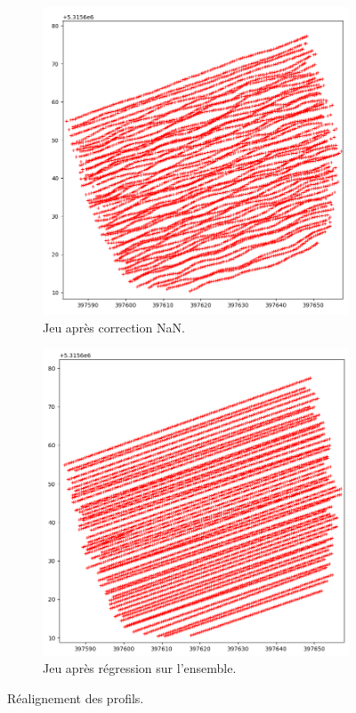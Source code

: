 \documentclass[12pt]{article}
\begin{document}
    \begin{figure}[ht!]
        \centering
        \begin{subfigure}[b]{0.475\textwidth}
            \centering
            \includegraphics[width=\textwidth]{Images/Regr_Avant2.png}
            \caption[]%
            {{ \small Jeu après correction NaN.}}    
        \end{subfigure}
        \hfill
        \begin{subfigure}[b]{0.475\textwidth}  
            \centering 
            \includegraphics[width=\textwidth]{Images/Regr_Apres2.png}
            \caption[]%
            {{\small Jeu après régression sur l'ensemble.}}    
        \end{subfigure}
        \caption{Réalignement des profils.}
    \end{figure}
\end{document}
